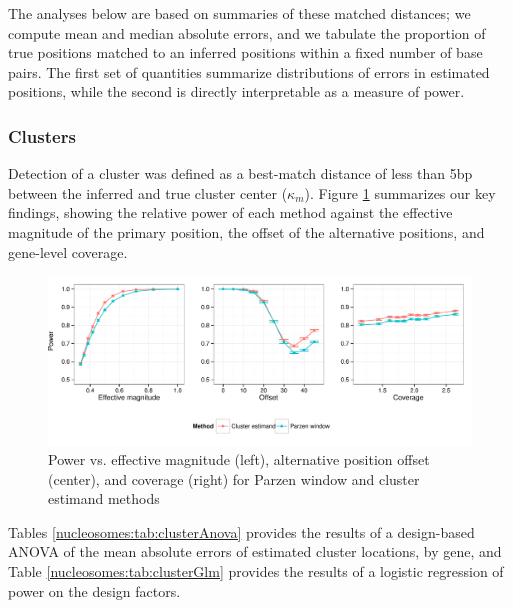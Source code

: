 The analyses below are based on summaries of these matched distances; we compute mean and median absolute errors, and we tabulate the proportion of true positions matched to an inferred positions within a fixed number of base pairs.
The first set of quantities summarize distributions of errors in estimated positions, while the second is directly interpretable as a measure of power.

\subsubsection{Clusters}
\label{nucleosomes:sec:clusterPower}

Detection of a cluster was defined as a best-match distance of less than 5bp between the inferred and true cluster center ($\kappa_m$).
Figure \ref{nucleosomes:fig:powerCluster} summarizes our key findings, showing the relative power of each method against the effective magnitude of the primary position, the offset of the alternative positions, and gene-level coverage.
%
\begin{figure}
\centering
\includegraphics[width=\textwidth]{figures/nucleosomes/figure_power_cluster_3-panel}
\caption{Power vs. effective magnitude (left), alternative position offset (center), and coverage (right) for Parzen window and cluster estimand methods \label{nucleosomes:fig:powerCluster}}
\end{figure}
%
Tables \ref{nucleosomes:tab:clusterAnova} provides the results of a design-based ANOVA of the mean absolute errors of  estimated cluster locations, by gene, and Table \ref{nucleosomes:tab:clusterGlm} provides the results of a logistic regression of power on the design factors.


